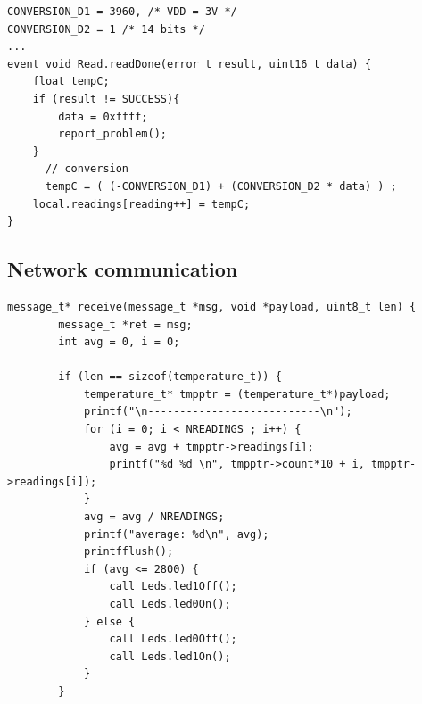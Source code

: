 \begin{lstlisting}
CONVERSION_D1 = 3960, /* VDD = 3V */
CONVERSION_D2 = 1 /* 14 bits */
...
event void Read.readDone(error_t result, uint16_t data) {
	float tempC;
	if (result != SUCCESS){
		data = 0xffff;
		report_problem();
	}
	  // conversion
	  tempC = ( (-CONVERSION_D1) + (CONVERSION_D2 * data) ) ;
    local.readings[reading++] = tempC;
}
\end{lstlisting}


\subsection{Network communication}

\begin{lstlisting}
message_t* receive(message_t *msg, void *payload, uint8_t len) {
		message_t *ret = msg;
		int avg = 0, i = 0;

		if (len == sizeof(temperature_t)) {
			temperature_t* tmpptr = (temperature_t*)payload;
			printf("\n---------------------------\n");
			for (i = 0; i < NREADINGS ; i++) {
				avg = avg + tmpptr->readings[i];
				printf("%d %d \n", tmpptr->count*10 + i, tmpptr->readings[i]);
			}
			avg = avg / NREADINGS;
			printf("average: %d\n", avg);
			printfflush();
			if (avg <= 2800) {
				call Leds.led1Off();
				call Leds.led0On();
			} else {
				call Leds.led0Off();
				call Leds.led1On();
			}
		}
\end{lstlisting}
